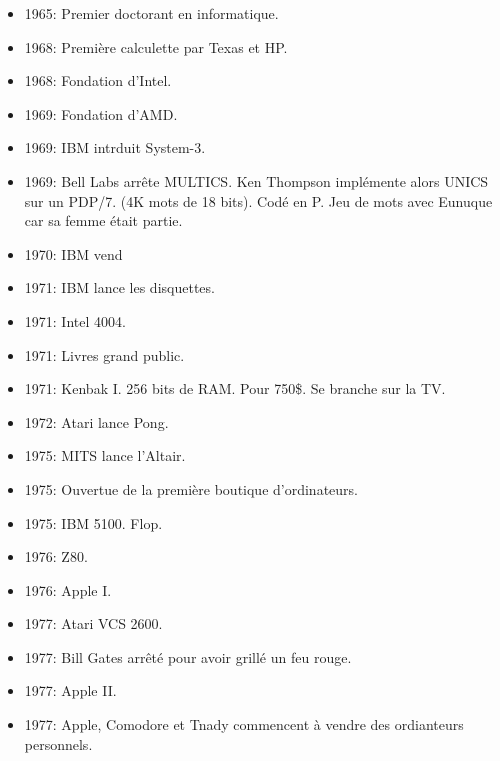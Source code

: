 \documentclass[a4paper,11pt]{article}
\begin{document}
\begin{itemize}
\item 1965: Premier doctorant en informatique.

\item 1968: Première calculette par Texas et HP.

\item 1968: Fondation d'Intel.

\item 1969: Fondation d'AMD.

\item 1969: IBM intrduit System-3.

\item 1969: Bell Labs arrête MULTICS. Ken Thompson implémente alors UNICS sur un
  PDP/7. (4K mots de 18 bits). Codé en P. Jeu de mots avec Eunuque car sa femme
  était partie.

\item 1970: IBM vend

\item 1971: IBM lance les disquettes.

\item 1971: Intel 4004.

\item 1971: Livres grand public.

\item 1971: Kenbak I. 256 bits de RAM. Pour 750\$. Se branche sur la TV.

\item 1972: Atari lance Pong.

\item 1975: MITS lance l'Altair.

\item 1975: Ouvertue de la première boutique d'ordinateurs.

\item 1975: IBM 5100. Flop.

\item 1976: Z80.

\item 1976: Apple I.

\item 1977: Atari VCS 2600.

\item 1977: Bill Gates arrêté pour avoir grillé un feu rouge.

\item 1977: Apple II.

\item 1977: Apple, Comodore et Tnady commencent à vendre des ordianteurs
  personnels.


\end{itemize}
\end{document}
